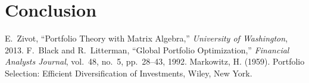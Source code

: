\documentclass[journal,transmag]{IEEEtran}
\begin{document}
\section{Conclusion}
\lipsum[1]

\ifCLASSOPTIONcaptionsoff
  \newpage
\fi


\begin{thebibliography}{1}
E.~Zivot, ``Portfolio Theory with Matrix Algebra,'' \emph{University of Washington}, 2013.
F.~Black and R.~Litterman, ``Global Portfolio Optimization,'' \emph{Financial Analysts Journal}, vol.~48, no.~5, pp.~28--43, 1992.
Markowitz, H. (1959). Portfolio Selection: Efficient Diversification of Investments, Wiley, New York.
\end{thebibliography}
\end{document}
